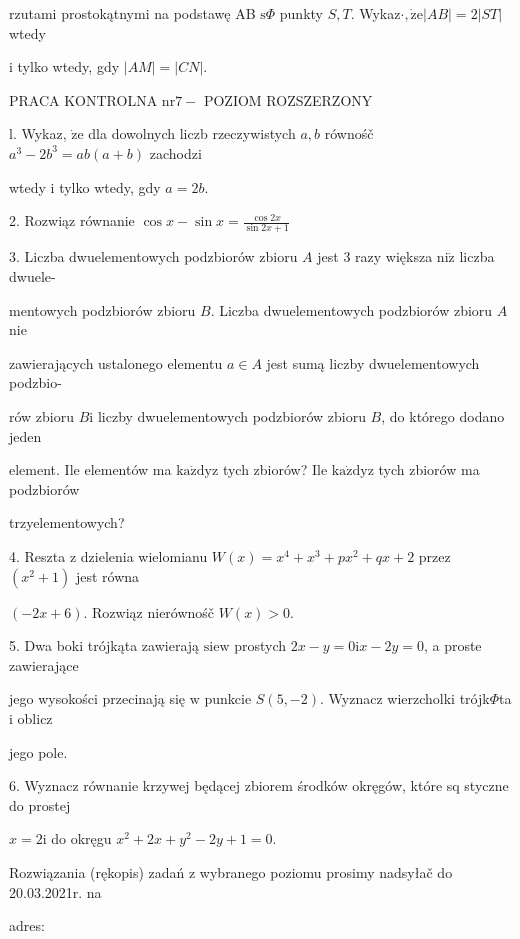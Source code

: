 \documentclass[a4paper,12pt]{article}
\begin{document}
rzutami prostokątnymi na podstawę AB $\mathrm{s}\Phi$ punkty $S, T$. Wykaz$\cdot, \dot{\mathrm{z}}\mathrm{e}|AB|=2|ST|$ wtedy

$\mathrm{i}$ tylko wtedy, gdy $|AM|=|CN|.$




PRACA KONTROLNA $\mathrm{n}\mathrm{r} 7-$ POZIOM ROZSZERZONY

l. Wykaz, $\dot{\mathrm{z}}\mathrm{e}$ dla dowolnych liczb rzeczywistych $a, b$ równośč $a^{3}-2b^{3}=ab(a+b)$ zachodzi

wtedy $\mathrm{i}$ tylko wtedy, gdy $a=2b.$

2. Rozwiąz równanie $\displaystyle \cos x-\sin x=\frac{\cos 2x}{\sin 2x+1}$

3. Liczba dwuelementowych podzbiorów zbioru $A$ jest 3 razy większa $\mathrm{n}\mathrm{i}\dot{\mathrm{z}}$ liczba dwuele-

mentowych podzbiorów zbioru $B$. Liczba dwuelementowych podzbiorów zbioru $A$ nie

zawierających ustalonego elementu $a\in A$ jest sumą liczby dwuelementowych podzbio-

rów zbioru $B\mathrm{i}$ liczby dwuelementowych podzbiorów zbioru $B$, do którego dodano jeden

element. Ile elementów ma $\mathrm{k}\mathrm{a}\dot{\mathrm{z}}\mathrm{d}\mathrm{y}\mathrm{z}$ tych zbiorów? Ile $\mathrm{k}\mathrm{a}\dot{\mathrm{z}}\mathrm{d}\mathrm{y}\mathrm{z}$ tych zbiorów ma podzbiorów

trzyelementowych?

4. Reszta $\mathrm{z}$ dzielenia wielomianu $W(x)=x^{4}+x^{3}+px^{2}+qx+2$ przez $(x^{2}+1)$ jest równa

$(-2x+6)$. Rozwiąz nierównośč $W(x)>0.$

5. Dwa boki trójkąta zawierają $\mathrm{s}\mathrm{i}\mathrm{e}\mathrm{w}$ prostych $2x-y=0\mathrm{i}x-2y=0$, a proste zawierające

jego wysokości przecinają się $\mathrm{w}$ punkcie $S(5,-2)$. Wyznacz wierzcholki trójk$\Phi$ta $\mathrm{i}$ oblicz

jego pole.

6. Wyznacz równanie krzywej będącej zbiorem środków okręgów, które sq styczne do prostej

$x=2\mathrm{i}$ do okręgu $x^{2}+2x+y^{2}-2y+1=0.$

Rozwiązania (rękopis) zadań z wybranego poziomu prosimy nadsyłač do 20.03.2021r. na

adres:
\end{document}
